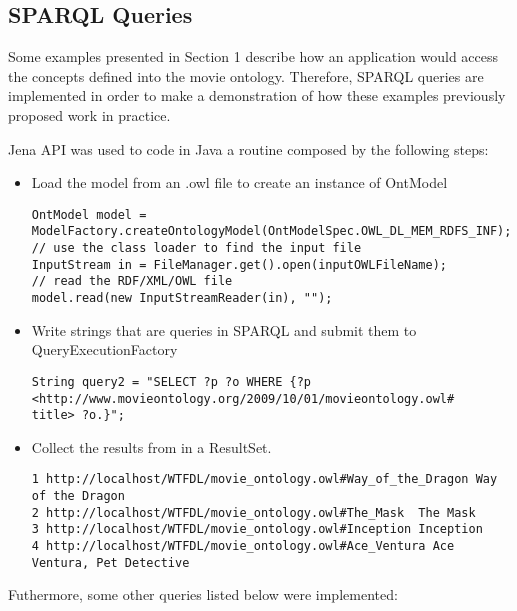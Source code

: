 \subsection{SPARQL Queries}
Some examples presented in Section 1 describe how an application would access the concepts defined into the movie ontology.
Therefore, SPARQL queries are implemented in order to make a demonstration of how these examples previously proposed work in practice.

Jena API was used to code in Java a routine composed by the following steps:

\begin{itemize}
  \item Load the model from an .owl file to create an instance of OntModel
\begin{lstlisting}
OntModel model = ModelFactory.createOntologyModel(OntModelSpec.OWL_DL_MEM_RDFS_INF);
// use the class loader to find the input file
InputStream in = FileManager.get().open(inputOWLFileName);
// read the RDF/XML/OWL file
model.read(new InputStreamReader(in), "");
\end{lstlisting}

  \item Write strings that are queries in SPARQL and submit them to QueryExecutionFactory
\begin{lstlisting}
String query2 = "SELECT ?p ?o WHERE {?p <http://www.movieontology.org/2009/10/01/movieontology.owl#
title> ?o.}";
\end{lstlisting}

  \item Collect the results from in a ResultSet.
\begin{lstlisting}
1 http://localhost/WTFDL/movie_ontology.owl#Way_of_the_Dragon Way of the Dragon 
2 http://localhost/WTFDL/movie_ontology.owl#The_Mask  The Mask  
3 http://localhost/WTFDL/movie_ontology.owl#Inception Inception 
4 http://localhost/WTFDL/movie_ontology.owl#Ace_Ventura Ace Ventura, Pet Detective  
\end{lstlisting}

\end{itemize}

Futhermore, some other queries listed below were implemented:

